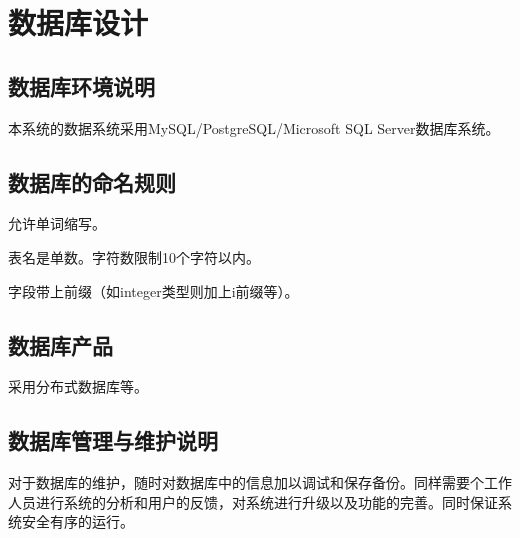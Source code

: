 \chapter{数据库设计}
\section{数据库环境说明}
本系统的数据系统采用MySQL/PostgreSQL/Microsoft SQL Server数据库系统。

\section{数据库的命名规则}
允许单词缩写。

表名是单数。字符数限制10个字符以内。

字段带上前缀（如integer类型则加上i前缀等）。

\section{数据库产品}
采用分布式数据库等。

\section{数据库管理与维护说明}
对于数据库的维护，随时对数据库中的信息加以调试和保存备份。同样需要个工作人员进行系统的分析和用户的反馈，对系统进行升级以及功能的完善。同时保证系统安全有序的运行。